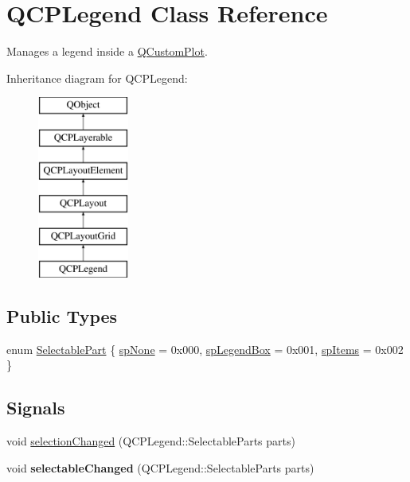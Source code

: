 \hypertarget{classQCPLegend}{}\section{Q\+C\+P\+Legend Class Reference}
\label{classQCPLegend}


Manages a legend inside a \hyperlink{classQCustomPlot}{Q\+Custom\+Plot}.  


Inheritance diagram for Q\+C\+P\+Legend\+:\begin{figure}[H]
\begin{center}
\leavevmode
\includegraphics[height=6.000000cm]{classQCPLegend}
\end{center}
\end{figure}
\subsection*{Public Types}
\begin{DoxyCompactItemize}
\item 
enum \hyperlink{classQCPLegend_a5404de8bc1e4a994ca4ae69e2c7072f1}{Selectable\+Part} \{ \hyperlink{classQCPLegend_a5404de8bc1e4a994ca4ae69e2c7072f1a378201c07d500af7126e3ec91652eed7}{sp\+None} = 0x000, 
\hyperlink{classQCPLegend_a5404de8bc1e4a994ca4ae69e2c7072f1a0fa4758962a46fa1dc9da818abae23c4}{sp\+Legend\+Box} = 0x001, 
\hyperlink{classQCPLegend_a5404de8bc1e4a994ca4ae69e2c7072f1a768bfb95f323db4c66473375032c0af7}{sp\+Items} = 0x002
 \}
\end{DoxyCompactItemize}
\subsection*{Signals}
\begin{DoxyCompactItemize}
\item 
void \hyperlink{classQCPLegend_a82c88464edac07a9eefaf3906268df3b}{selection\+Changed} (Q\+C\+P\+Legend\+::\+Selectable\+Parts parts)
\item 
\hypertarget{classQCPLegend_a8a77300fd0976d6bdd8000f4e8d114b8}{}void {\bfseries selectable\+Changed} (Q\+C\+P\+Legend\+::\+Selectable\+Parts parts)\label{classQCPLegend_a8a77300fd0976d6bdd8000f4e8d114b8}

\end{DoxyCompactItemize}
